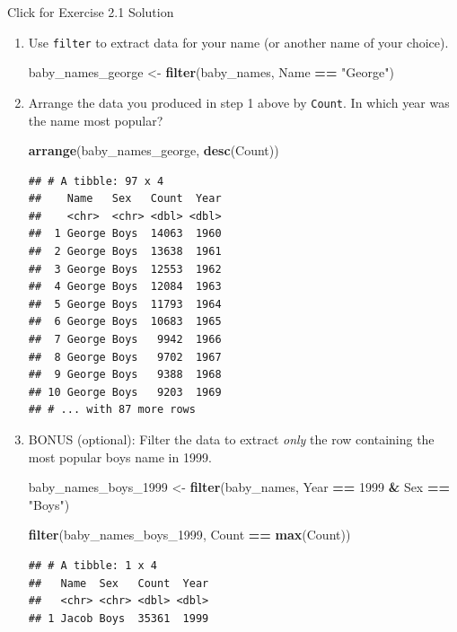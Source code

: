 \documentclass[
]{book}
\newenvironment{Shaded}{\begin{snugshade}}{\end{snugshade}}
\newcommand{\DecValTok}[1]{\textcolor[rgb]{0.00,0.00,0.81}{#1}}
\newcommand{\KeywordTok}[1]{\textcolor[rgb]{0.13,0.29,0.53}{\textbf{#1}}}
\newcommand{\NormalTok}[1]{#1}
\newcommand{\OperatorTok}[1]{\textcolor[rgb]{0.81,0.36,0.00}{\textbf{#1}}}
\newcommand{\StringTok}[1]{\textcolor[rgb]{0.31,0.60,0.02}{#1}}
\begin{document}
{Click for Exercise 2.1 Solution}

\begin{enumerate}
\def\labelenumi{\arabic{enumi}.}
\item
  Use \texttt{filter} to extract data for your name (or another name of your choice).

\begin{Shaded}
\begin{Highlighting}[]
\NormalTok{baby\_names\_george \textless{}{-}}\StringTok{ }\KeywordTok{filter}\NormalTok{(baby\_names, Name }\OperatorTok{==}\StringTok{ "George"}\NormalTok{)}
\end{Highlighting}
\end{Shaded}
\item
  Arrange the data you produced in step 1 above by \texttt{Count}. In which year was the name most popular?

\begin{Shaded}
\begin{Highlighting}[]
\KeywordTok{arrange}\NormalTok{(baby\_names\_george, }\KeywordTok{desc}\NormalTok{(Count))}
\end{Highlighting}
\end{Shaded}

\begin{verbatim}
## # A tibble: 97 x 4
##    Name   Sex   Count  Year
##    <chr>  <chr> <dbl> <dbl>
##  1 George Boys  14063  1960
##  2 George Boys  13638  1961
##  3 George Boys  12553  1962
##  4 George Boys  12084  1963
##  5 George Boys  11793  1964
##  6 George Boys  10683  1965
##  7 George Boys   9942  1966
##  8 George Boys   9702  1967
##  9 George Boys   9388  1968
## 10 George Boys   9203  1969
## # ... with 87 more rows
\end{verbatim}
\item
  BONUS (optional): Filter the data to extract \emph{only} the row containing the most popular boys name in 1999.

\begin{Shaded}
\begin{Highlighting}[]
\NormalTok{baby\_names\_boys\_}\DecValTok{1999}\NormalTok{ \textless{}{-}}\StringTok{ }\KeywordTok{filter}\NormalTok{(baby\_names,}
\NormalTok{                               Year }\OperatorTok{==}\StringTok{ }\DecValTok{1999} \OperatorTok{\&}\StringTok{ }\NormalTok{Sex }\OperatorTok{==}\StringTok{ "Boys"}\NormalTok{)}
\end{Highlighting}
\end{Shaded}

\begin{Shaded}
\begin{Highlighting}[]
\KeywordTok{filter}\NormalTok{(baby\_names\_boys\_}\DecValTok{1999}\NormalTok{, Count }\OperatorTok{==}\StringTok{ }\KeywordTok{max}\NormalTok{(Count))}
\end{Highlighting}
\end{Shaded}

\begin{verbatim}
## # A tibble: 1 x 4
##   Name  Sex   Count  Year
##   <chr> <chr> <dbl> <dbl>
## 1 Jacob Boys  35361  1999
\end{verbatim}
\end{enumerate}
\end{document}
